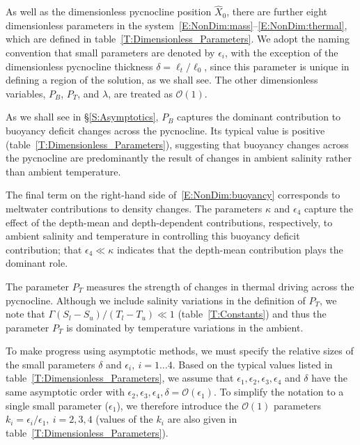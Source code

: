 \documentclass[openacc]{rsproca_new}%
\newcommand{\order}[1]{\mathcal{O}(#1)}
\newcommand{\epsone}{\epsilon_{1}} %
\newcommand{\epstwo}{\epsilon_{2}} %
\newcommand{\epsthree}{\epsilon_{3}} %
\newcommand{\epsfour}{\epsilon_{4}}
\newcommand{\Pb}{\textit{P}_B}  %
\newcommand{\lt}{\delta} %
\newcommand{\Pt}{\textit{P}_T}
\begin{document}
 
As well as the dimensionless pycnocline position $\hat{X}_0$, there are further eight dimensionless parameters in the system~\eqref{E:NonDim:mass}--\eqref{E:NonDim:thermal}, which are defined in table~\ref{T:Dimensionless_Parameters}. We adopt the naming convention that small parameters are denoted by $\epsilon_i$, with the exception of the dimensionless pycnocline thickness $\delta = \ell_t / \ell_0$, since this parameter is unique in defining a region of the solution, as we shall see. The other dimensionless variables, $\Pb$, $\Pt$, and $\lambda$, are treated as $\order{1}$.

As we shall see in \S\ref{S:Asymptotics}, $\Pb$ captures the dominant contribution to buoyancy deficit changes across the pycnocline. Its typical value is positive (table~\ref{T:Dimensionless_Parameters}), suggesting that buoyancy changes across the pycnocline are predominantly the result of changes in ambient salinity rather than ambient temperature.

The final term on the right-hand side of~\eqref{E:NonDim:buoyancy} corresponds to meltwater contributions to density changes. The parameters $\kappa$ and $\epsfour$ capture the effect of the depth-mean and depth-dependent contributions, respectively, to ambient salinity and temperature in controlling this buoyancy deficit contribution; that $\epsfour \ll \kappa$ indicates that the depth-mean contribution plays the dominant role.

The parameter $\Pt$ measures the strength of changes in thermal driving across the pycnocline. Although we include salinity variations in the definition of $\Pt$, we note that $\Gamma (S_l - S_u)/(T_l - T_u) \ll 1$ (table~\ref{T:Constants}) and thus the parameter $\Pt$ is dominated by temperature variations in the ambient.

To make progress using asymptotic methods, we must specify the relative sizes of the small parameters $\lt$ and $\epsilon_i, ~i = 1\dots4$. Based on the typical values listed in table~\ref{T:Dimensionless_Parameters}, we assume that $\epsone, \epstwo, \epsthree, \epsfour$ and $\lt$ have the same asymptotic order with $\epstwo, \epsthree, \epsfour, \lt = \order{\epsone}$. To simplify the notation to a single small parameter ($\epsone$), we therefore introduce the $\order{1}$ parameters $k_i =\epsilon_i/ \epsone,~i = 2,3,4$ (values of the $k_i$ are also given in table~\ref{T:Dimensionless_Parameters}).
\end{document}

